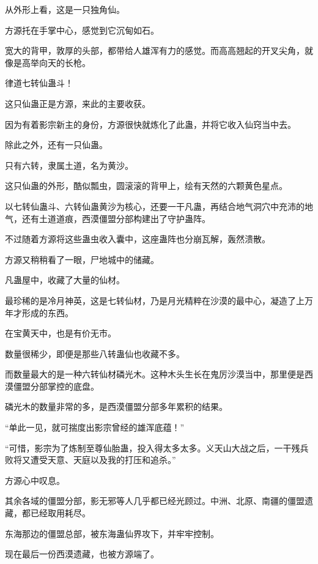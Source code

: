 
\begin{this_body}



从外形上看，这是一只独角仙。

方源托在手掌中心，感觉到它沉甸如石。

宽大的背甲，敦厚的头部，都带给人雄浑有力的感觉。而高高翘起的开叉尖角，就像是高举向天的长枪。

律道七转仙蛊斗！

这只仙蛊正是方源，来此的主要收获。

因为有着影宗新主的身份，方源很快就炼化了此蛊，并将它收入仙窍当中去。

除此之外，还有一只仙蛊。

只有六转，隶属土道，名为黄沙。

这只仙蛊的外形，酷似瓢虫，圆滚滚的背甲上，绘有天然的六颗黄色星点。

以七转仙蛊斗、六转仙蛊黄沙为核心，还要一干凡蛊，再结合地气洞穴中充沛的地气，还有土道道痕，西漠僵盟分部构建出了守护蛊阵。

不过随着方源将这些蛊虫收入囊中，这座蛊阵也分崩瓦解，轰然溃散。

方源又稍稍看了一眼，尸地城中的储藏。

凡蛊屋中，收藏了大量的仙材。

最珍稀的是冷月神英，这是七转仙材，乃是月光精粹在沙漠的最中心，凝造了上万年才形成的东西。

在宝黄天中，也是有价无市。

数量很稀少，即便是那些八转蛊仙也收藏不多。

而数量最大的是一种六转仙材磷光木。这种木头生长在鬼厉沙漠当中，那里便是西漠僵盟分部掌控的底盘。

磷光木的数量非常的多，是西漠僵盟分部多年累积的结果。

“单此一见，就可揣度出影宗曾经的雄浑底蕴！”

“可惜，影宗为了炼制至尊仙胎蛊，投入得太多太多。义天山大战之后，一干残兵败将又遭受天意、天庭以及我的打压和追杀。”

方源心中叹息。

其余各域的僵盟分部，影无邪等人几乎都已经光顾过。中洲、北原、南疆的僵盟遗藏，都已经取用耗尽。

东海那边的僵盟总部，被东海蛊仙界攻下，并牢牢控制。

现在最后一份西漠遗藏，也被方源端了。


\end{this_body}

